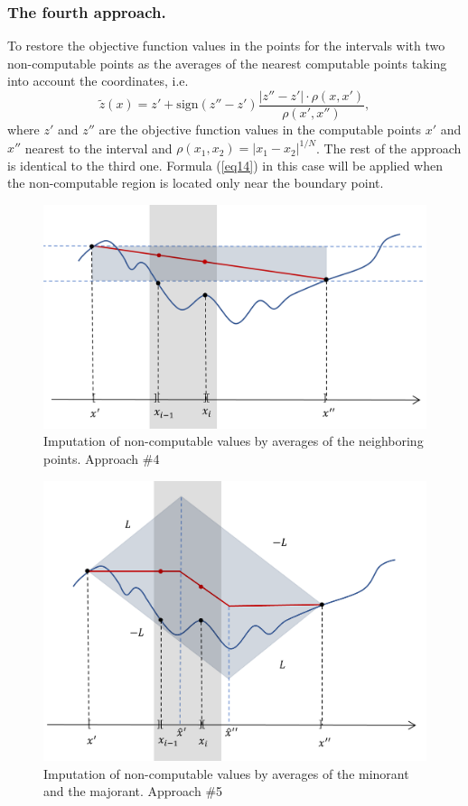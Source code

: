\documentclass[runningheads]{llncs}
\begin{document}
\subsubsection{The fourth approach.} To restore the objective function values in the points for the intervals with two non-computable points as the averages of the nearest computable points taking into account the coordinates, i.e.
\begin{equation}\label{eq17} 
\tilde{z}(x)=z'+ \text{sign}(z''-z') \frac {|z''-z'| \cdot \rho(x,x')}{\rho(x',x'') },
\end{equation}
where $z'$ and $z''$ are the objective function values in the computable points $x'$ and $x''$  nearest to the interval and $\rho(x_1,x_2) =  |x_1 - x_2|^{1/N}$.
The rest of the approach is identical to the third one. Formula (\ref{eq14}) in this case will be applied when the non-computable region is located only near the boundary point.
\begin{figure}
\includegraphics[width=\textwidth]{fig4.png}
\caption{Imputation of non-computable values by averages of the neighboring points. Approach \#4} \label{fig4}
\end{figure}
\begin{figure}
\includegraphics[width=\textwidth]{fig5.png}
\caption{Imputation of non-computable values by averages of the minorant and the majorant. Approach \#5} \label{fig5}
\end{figure}
\end{document}
